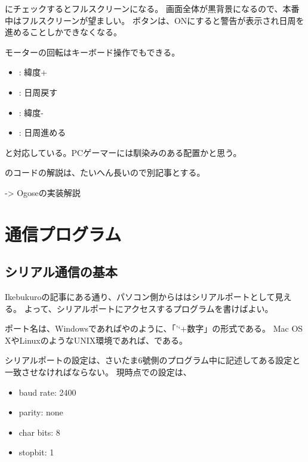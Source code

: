 \documentclass[letterpaper,10pt,dvipdfmx]{sphinxmanual}
\begin{document}
 にチェックするとフルスクリーンになる。
画面全体が黒背景になるので、本番中はフルスクリーンが望ましい。
ボタンは、ONにすると警告が表示され日周を進めることしかできなくなる。

モーターの回転はキーボード操作でもできる。
\begin{itemize}
\item {} 
: 緯度+

\item {} 
: 日周戻す

\item {} 
: 緯度-

\item {} 
: 日周進める

\end{itemize}

と対応している。PCゲーマーには馴染みのある配置かと思う。

のコードの解説は、たいへん長いので別記事とする。

-\textgreater{} Ogoseの実装解説


\section{通信プログラム}
\label{\detokenize{nissyu-idohen/pc-software:id5}}

\subsection{シリアル通信の基本}
\label{\detokenize{nissyu-idohen/pc-software:id6}}
Ikebukuroの記事にある通り、パソコン側からははシリアルポートとして見える。
よって、シリアルポートにアクセスするプログラムを書けばよい。

ポート名は、Windowsであればやのように、「'`+数字」の形式である。
Mac OS
XやLinuxのようなUNIX環境であれば、である。

シリアルポートの設定は、さいたま6號側のプログラム中に記述してある設定と一致させなければならない。
現時点での設定は、
\begin{itemize}
\item {} 
baud rate: 2400

\item {} 
parity: none

\item {} 
char bits: 8

\item {} 
stopbit: 1

\end{itemize}
\end{document}
